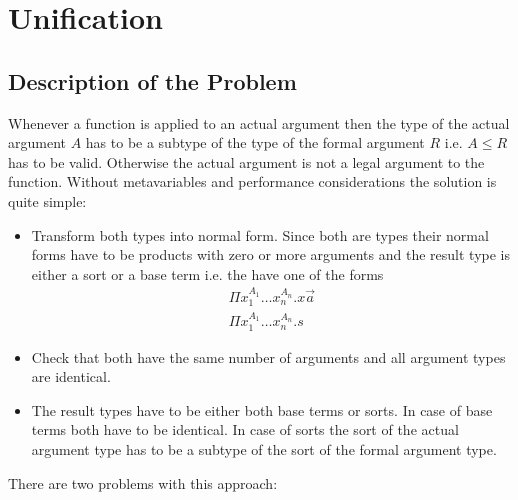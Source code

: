 \section{Unification}






\subsection{Description of the Problem}

Whenever a function is applied to an actual argument then the type of the actual
argument $A$ has to be a subtype of the type of the formal argument $R$ i.e. $A
\le R$ has to be valid. Otherwise the actual argument is not a legal argument to
the function. Without metavariables and performance considerations the solution
is quite simple:

\begin{itemize}

    \item Transform both types into normal form. Since both are types their normal
        forms have to be products with zero or more arguments and the result type is
        either a sort or a base term i.e. the have one of the forms
        $$
        \begin{array}{l}
            \Pi x_1^{A_1} \ldots x_n^{A_n}. x \vec a
            \\
            \Pi x_1^{A_1} \ldots x_n^{A_n}. s
        \end{array}
        $$

    \item Check that both have the same number of arguments and  all argument types
        are identical.

    \item The result types have to be either both base terms or sorts. In case of
        base terms both have to be identical. In case of sorts the sort of the actual
        argument type has to be a subtype of the sort of the formal argument type.

\end{itemize}


There are two problems with this approach:

